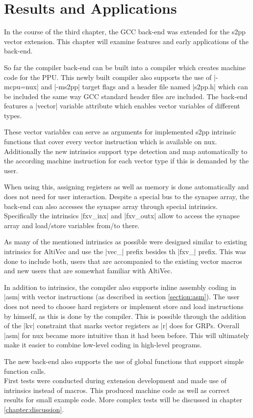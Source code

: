 \chapter{Results and Applications}
\label{ch:results}
In the course of the third chapter, the GCC back-end was extended for the s2pp vector extension.
This chapter will examine features and early applications of the back-end.

So far the compiler back-end can be built into a compiler which creates machine code for the PPU.
This newly built compiler also supports the use of |-mcpu=nux| and |-ms2pp| target flags and a header file named |s2pp.h| which can be included the same way GCC standard header files are included.
The back-end features a |vector| variable attribute which enables vector variables of different types.

These vector variables can serve as arguments for implemented s2pp intrinsic functions that cover every vector instruction which is available on nux.
Additionally the new intrinsics support type detection and map automatically to the according machine instruction for each vector type if this is demanded by the user.

When using this, assigning registers as well as memory is done automatically and does not need for user interaction.
Despite a special bus to the synapse array, the back-end can also accesses the synapse array through special intrinsics.
Specifically the intrinsics |fxv_inx| and |fxv_outx| allow to access the synapse array and load/store variables from/to there.

As many of the mentioned intrinsics as possible were designed similar to existing intrinsics for AltiVec and use the |vec_| prefix besides th |fxv_| prefix.
This was done to include both, users that are accompanied to the existing vector macros and new users that are somewhat familiar with AltiVec.

In addition to intrinsics, the compiler also supports inline assembly coding in |asm| with vector instructions (as described in section \ref{section:asm}).
The user does not need to choose hard registers or implement store and load instructions by himself, as this is done by the compiler.
This is possible through the addition of the |kv| constraint that marks vector registers as |r| does for GRPs.
Overall |asm| for nux became more intuitive than it had been before.
This will ultimately make it easier to combine low-level coding in high-level programs.

The new back-end also supports the use of global functions that support simple function calls.
\\
First tests were conducted during extension development and made use of intrinsics instead of macros.
This produced machine code as well as correct results for small example code.
More complex tests will be discussed in chapter \ref{chapter:discussion}.

